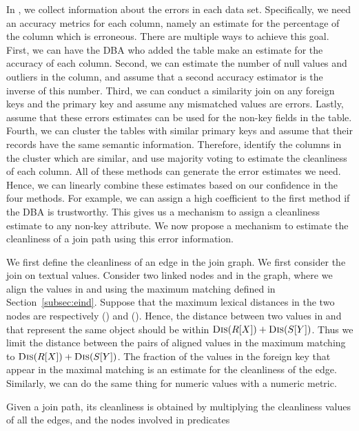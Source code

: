 In \dcv, we collect information about the errors in each data set. Specifically, we need an accuracy metrics for each column, namely an estimate for the percentage of the column which is erroneous. There are multiple ways to achieve this goal. First, we can have the DBA who added the table make an estimate for the accuracy of each column. Second, we can estimate the number of null values and outliers in the column, and assume that a second accuracy estimator is the inverse of this number. Third, we can conduct a similarity join on any foreign keys and the primary key and assume any mismatched values are errors. Lastly, assume that these errors estimates can be used for the non-key fields in the table. Fourth, we can cluster the tables with similar primary keys and assume that their records have the same semantic information.  Therefore, identify the columns in the cluster which are similar, and use majority voting to estimate the cleanliness of each column. All of these methods can generate the  error estimates we need. Hence, we can linearly combine these estimates based on our confidence in the four methods. For example, we can assign a high coefficient to the first method if the DBA is trustworthy. This gives us a mechanism to assign a cleanliness estimate to any non-key attribute. We now propose a mechanism to estimate the cleanliness of a join path using this error information.


We first define the cleanliness of an edge in the join graph. We first consider the join on textual values. Consider two linked nodes \RX and \SY in the graph, where we align the values in \RX and \SY using the maximum matching defined in Section~\ref{subsec:eind}. Suppose that the maximum lexical distances in the two nodes are respectively \Dis(\RX) and \Dis(\SY). Hence, the distance between two values in \RX and \SY that represent the same object should be within $\textsc{Dis}(R[X])+\textsc{Dis}(S[Y])$. Thus we limit the distance between the pairs of aligned values in the maximum matching to $\textsc{Dis}(R[X])+\textsc{Dis}(S[Y])$. The fraction of the values in the foreign key that appear in the maximal matching is an estimate for the cleanliness of the edge. Similarly, we can do the same thing for numeric values with a numeric metric.

Given a join path, its cleanliness is obtained by multiplying the cleanliness values of all the edges, and the nodes involved in predicates 

